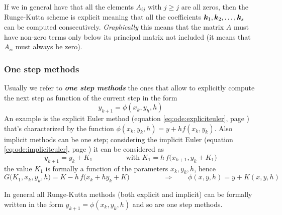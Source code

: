 		If we in general have that all the elements $A_{ij}$ with $j\geq j$ are all zeros, then the Runge-Kutta scheme is explicit meaning that all the coefficients $\boldsymbol{k}_1,\boldsymbol{k}_2,\dots, \boldsymbol{k}_s$ can be computed consecutively. \textit{Graphically} this means that the matrix $A$ must have non-zero terms only below its principal matrix not included (it means that $A_{ii}$ must always be zero).
		
		\subsubsection{One step methods}
		Usually we refer to \textbf{\textit{one step methods}} the ones that allow to explicitly compute the next step as function of the current step in the form
		\[ y_{k+1} = \phi(x_k,y_h,h) \]		
		An example is the explicit Euler method (equation \ref{eq:ode:expliciteuler}, page \pageref{eq:ode:expliciteuler}) that's characterized by the function $\phi(x_k,y_k,h) = y + h f(x_k,y_k)$. Also implicit methods can be one step; considering the implicit Euler (equation \ref{eq:ode:impliciteuler}, page \pageref{eq:ode:impliciteuler}) it can be considered as 
		\[ y_{k+1} = y_k + K_1 \hspace{2cm} \textrm{with } K_1 = h\, f\big(x_{k+1}, y_k + K_1\big) \]
		the value $K_1$ is formally a function of the parameters $x_k,y_k,h$, hence
		\[ G\big(K_1, x_k,y_k,h\big) = K - h\, f\big(x_k + h y_k + K\big) \hspace{2cm} \Rightarrow \qquad \phi(x,y,h) = y + K(x,y,h) \]
		
		In general all Runge-Kutta methods (both explicit and implicit) can be formally written in the form $y_{k+1} = \phi(x_k,y_k,h)$ and so are one step methods.
		
